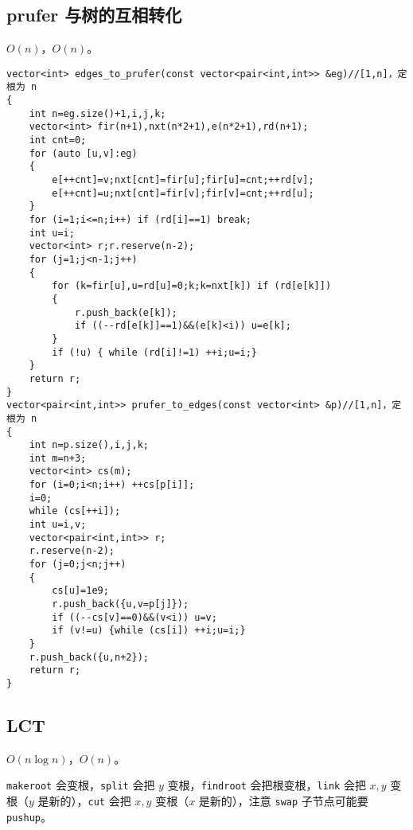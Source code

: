 \documentclass[12pt]{ctexart}
\begin{document}
\subsection{prufer 与树的互相转化}

$O(n)$，$O(n)$。

\begin{lstlisting}
vector<int> edges_to_prufer(const vector<pair<int,int>> &eg)//[1,n]，定根为 n
{
	int n=eg.size()+1,i,j,k;
	vector<int> fir(n+1),nxt(n*2+1),e(n*2+1),rd(n+1);
	int cnt=0;
	for (auto [u,v]:eg)
	{
		e[++cnt]=v;nxt[cnt]=fir[u];fir[u]=cnt;++rd[v];
		e[++cnt]=u;nxt[cnt]=fir[v];fir[v]=cnt;++rd[u];
	}
	for (i=1;i<=n;i++) if (rd[i]==1) break;
	int u=i;
	vector<int> r;r.reserve(n-2);
	for (j=1;j<n-1;j++)
	{	
		for (k=fir[u],u=rd[u]=0;k;k=nxt[k]) if (rd[e[k]]) 
		{
			r.push_back(e[k]);
			if ((--rd[e[k]]==1)&&(e[k]<i)) u=e[k];
		}
		if (!u) { while (rd[i]!=1) ++i;u=i;}
	}
	return r;
}
vector<pair<int,int>> prufer_to_edges(const vector<int> &p)//[1,n]，定根为 n
{
	int n=p.size(),i,j,k;
	int m=n+3;
	vector<int> cs(m);
	for (i=0;i<n;i++) ++cs[p[i]];
	i=0;
	while (cs[++i]);
	int u=i,v;
	vector<pair<int,int>> r;
	r.reserve(n-2);
	for (j=0;j<n;j++)
	{
		cs[u]=1e9;
		r.push_back({u,v=p[j]});
		if ((--cs[v]==0)&&(v<i)) u=v;
		if (v!=u) {while (cs[i]) ++i;u=i;}
	}
	r.push_back({u,n+2});
	return r;
}

\end{lstlisting}



\subsection{LCT}

$O(n\log n)$，$O(n)$。

\verb|makeroot| 会变根，\verb|split| 会把 $y$ 变根，\verb|findroot| 会把根变根，\verb|link| 会把 $x,y$ 变根（$y$ 是新的），\verb|cut| 会把 $x,y$ 变根（$x$ 是新的），注意 \verb|swap| 子节点可能要 \verb|pushup|。
\end{document}
